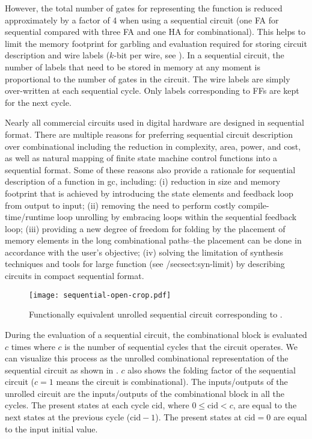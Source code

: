 However, the total number of gates for representing the function is reduced approximately by a factor of 4 when using a sequential circuit (one FA for sequential compared with three FA and one HA for combinational).
This helps to limit the memory footprint for garbling and evaluation required for storing circuit description and wire labels ($k$-bit per wire, see ).
In a sequential circuit, the number of labels that need to be stored in memory at any moment is proportional to the number of gates in the circuit.
The wire labels are simply over-written at each sequential cycle.
Only labels corresponding to FFs are kept for the next cycle.

Nearly all commercial circuits used in digital hardware are designed in sequential format.
There are multiple reasons for preferring sequential circuit description over combinational including the reduction in complexity, area, power, and cost, as well as natural mapping of finite state machine control functions into a sequential format.
Some of these reasons also provide a rationale for sequential description of a function in \acrshort{gc}, including: (i) reduction in size and memory footprint that is achieved by introducing the state elements and feedback loop from output to input; (ii) removing the need to perform costly compile-time/runtime loop unrolling by embracing loops within the sequential feedback loop; (iii) providing a new degree of freedom for folding by the placement of memory elements in the long combinational paths--the placement can be done in accordance with the user's objective; (iv) solving the limitation of synthesis techniques and tools for large function (see /sec{sect:syn-limit}) by describing circuits in compact sequential format.

\begin{figure}[ht]
  \centering
  \texttt{[image: sequential-open-crop.pdf]}
  \caption{Functionally equivalent unrolled sequential circuit corresponding to .}
  \label{fig:open-sequential}
\end{figure}

During the evaluation of a sequential circuit, the combinational block is evaluated $c$ times where $c$ is the number of sequential cycles that the circuit operates.
We can visualize this process as the unrolled combinational representation of the sequential circuit as shown in .
$c$ also shows the folding factor of the sequential circuit ($c=1$ means the circuit is combinational).
The inputs/outputs of the unrolled circuit are the inputs/outputs of the combinational block in all the cycles.
The present states at each cycle $\textrm{cid}$, where $0 \le \textrm{cid} < c$, are equal to the next states at the previous cycle ($\textrm{cid}-1$).
The present states at $\textrm{cid}=0$ are equal to the input initial value.

